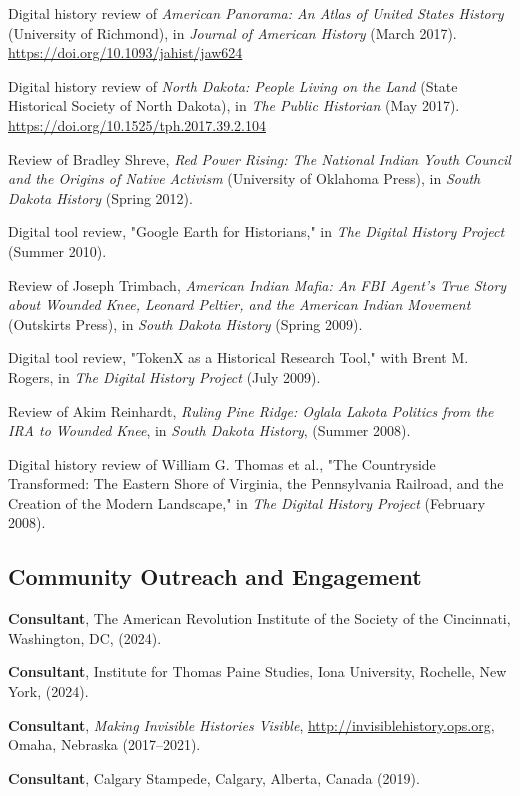 \documentclass[10pt]{article}
\begin{document}
Digital history review of \textit{American Panorama: An Atlas of United States History} (University of Richmond), in \textit{Journal of American History} (March 2017). \url{https://doi.org/10.1093/jahist/jaw624}

Digital history review of \textit{North Dakota: People Living on the Land} (State Historical Society of North Dakota), in \textit{The Public Historian} (May 2017). \url{https://doi.org/10.1525/tph.2017.39.2.104}

Review of Bradley Shreve, \textit{Red Power Rising: The National Indian Youth Council and the Origins of Native Activism} (University of Oklahoma Press), in \textit{South Dakota History} (Spring 2012).

Digital tool review, "Google Earth for Historians," in \textit{The Digital History Project} (Summer 2010).

Review of Joseph Trimbach, \textit{American Indian Mafia: An FBI Agent's True Story about Wounded Knee, Leonard Peltier, and the American Indian Movement} (Outskirts Press), in \textit{South Dakota History} (Spring 2009).

Digital tool review, "TokenX as a Historical Research Tool," with Brent M. Rogers, in \textit{The Digital History Project} (July 2009).

Review of Akim Reinhardt, \textit{Ruling Pine Ridge: Oglala Lakota Politics from the IRA to Wounded Knee}, in \textit{South Dakota History}, (Summer 2008).

Digital history review of William G. Thomas et al., "The Countryside Transformed: The Eastern Shore of Virginia, the Pennsylvania Railroad, and the Creation of the Modern Landscape," in \textit{The Digital History Project} (February 2008).

\subsection{Community Outreach and Engagement}

\textbf{Consultant}, The American Revolution Institute of the Society of the Cincinnati, Washington, DC, (2024).

\textbf{Consultant}, Institute for Thomas Paine Studies, Iona University, Rochelle, New York, (2024). 

\textbf{Consultant}, \textit{Making Invisible Histories Visible}, \url{http://invisiblehistory.ops.org}, Omaha, Nebraska (2017--2021).

\textbf{Consultant}, Calgary Stampede, Calgary, Alberta, Canada (2019).
\end{document}
